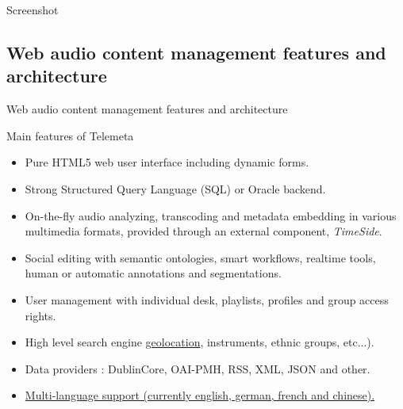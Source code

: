 \documentclass[final, hyperref, table]{beamer}
\begin{document}
\begin{frame}[plain]{Screenshot}
  \begin{center}
  \end{center}

\end{frame}

\subsection{Web audio content management features and architecture}
\begin{frame}[label=telemeta_features]{Web audio content management features and architecture}
  \begin{block}{Main features of Telemeta}
    \begin{itemize}
      \item \alert{Pure HTML5} web user interface including dynamic forms.
      \item Strong Structured Query Language (\alert{SQL}) or Oracle backend.
      \item \alert{On-the-fly audio analyzing}, transcoding and metadata
        embedding in various multimedia formats, provided through an external component, \emph{TimeSide}.
      \item Social editing with semantic ontologies, smart workflows,
        realtime tools, human or automatic annotations and
        segmentations.
      \item \alert{User management} with individual desk, playlists, profiles
        and group access rights.
      \item High level \alert{search engine} \hyperlink{geonavigator}{geolocation}, instruments, ethnic groups, etc...).
      \item Data providers : DublinCore, OAI-PMH, RSS, XML, JSON and other.
      \item \hyperlink{telemeta_languages}{Multi-language support (currently english, german, french and chinese).}
      \end{itemize}
  \end{block}
\end{frame}
\end{document}
